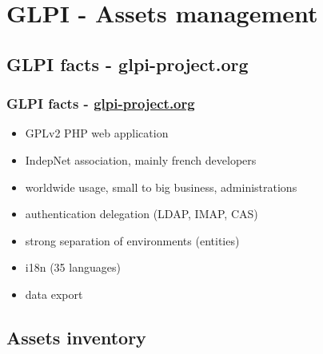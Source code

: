\documentclass{beamer}
\begin{document}
\section{GLPI - Assets management}
%

\subsection{GLPI facts - glpi-project.org}
\begin{frame}
\frametitle{GLPI facts - \href{http://glpi-project.org}{glpi-project.org}}
\begin{itemize}
%
\item GPLv2 PHP web application
\item IndepNet association, mainly french developers
\item worldwide usage, small to big business, administrations
\item authentication delegation (LDAP, IMAP, CAS)
\item strong separation of environments (entities)
\item i18n (35 languages)
\item data export
%
\end{itemize}
\end{frame}

\subsection{Assets inventory}
\end{document}
